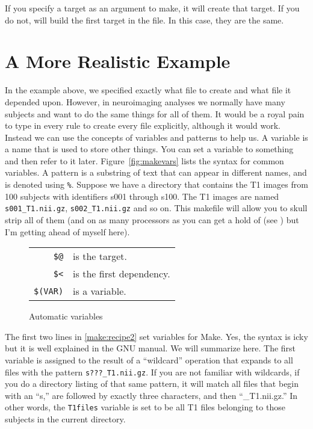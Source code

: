 If you specify a target as an argument to make, it will create that target. If you do not, \maken{} will build the first target in the file. In this case, they are the same.
	
\section{A More Realistic Example}
	
In the example above, we specified exactly what file to create and what file it depended upon. However, in neuroimaging analyses we normally have many subjects and want to do the same things for all of them. It would be a royal pain to type in every rule to create every file explicitly, although it would work. Instead we can use the concepts of variables and patterns to help us. 
A variable is a name that is used to store other things. You can set a variable to something and then refer to it later. Figure~\autoref{fig:makevars} lists the syntax for common \maken{} variables. A pattern is a substring of text that can appear in different names, and is denoted using \texttt{\%}.
Suppose we have a directory that contains the T1 images from 100 subjects with identifiers s001 through s100. The T1 images are named \texttt{s001_T1.nii.gz}, \texttt{s002_T1.nii.gz} and so on. This makefile will allow you to skull strip all of them (and on as many processors as you can get a hold of (see ) but I'm getting ahead of myself here).
	
\begin{figure}[h!]
	\begin{center}
		\begin{tabular}{ r l }
			\texttt{\$@}	& is the target. \\
			\texttt{\$<}	& is the first dependency. \\
			\texttt{\$(VAR)}& is a \maken{} variable.
		\end{tabular}
	\end{center}	
	\caption{Automatic \maken{} variables}
        \label{fig:makevars}
\end{figure}

The first two lines in \autoref{make:recipe2} set variables for Make. Yes, the syntax is icky but it is well explained in the GNU \maken{} manual. We will summarize here. The first variable is assigned to the result of a ``wildcard'' operation that expands to all files with the pattern \texttt{s???_T1.nii.gz}. If you are not familiar with wildcards, if you do a directory listing of that same pattern, it will match all files that begin with an ``s,'' are followed by exactly three characters, and then ``_T1.nii.gz.'' In other words, the \texttt{T1files} variable is set to be all T1 files belonging to those subjects in the current directory.
	
